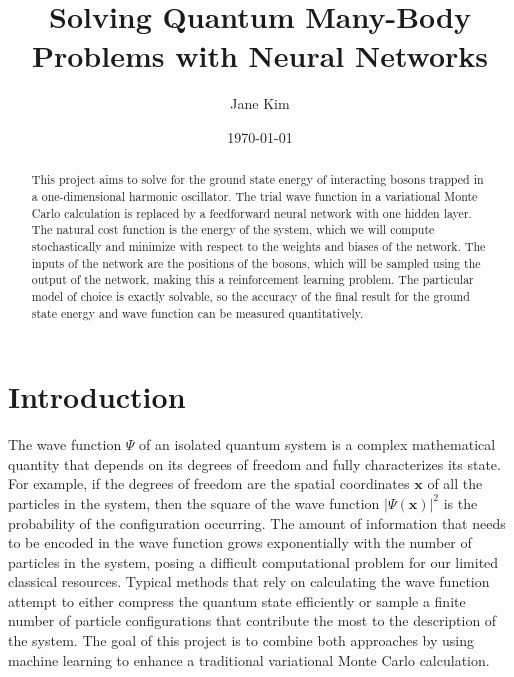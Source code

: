 \documentclass[prb,aps,twocolumn,showpacs,10pt]{revtex4-1}
\begin{document}
\title {Solving Quantum Many-Body Problems with Neural Networks}
\author{Jane Kim}
\date{\today}
\begin{abstract}
\vspace*{3mm}
This project aims to solve for the ground state energy of interacting bosons trapped in a one-dimensional harmonic oscillator. The trial wave function in a variational Monte Carlo calculation is replaced by a feedforward neural network with one hidden layer. The natural cost function is the energy of the system, which we will compute stochastically and minimize with respect to the weights and biases of the network. The inputs of the network are the positions of the bosons, which will be sampled using the output of the network, making this a reinforcement learning problem. The particular model of choice is exactly solvable, so the accuracy of the final result for the ground state energy and wave function can be measured quantitatively.
\end{abstract}

\maketitle


\section{Introduction}

The wave function $\Psi$ of an isolated quantum system is a complex mathematical quantity that depends on its degrees of freedom and fully characterizes its state. For example, if the degrees of freedom are the spatial coordinates $\bm{x}$ of all the particles in the system, then the square of the wave function $| \Psi(\bm{x}) |^2$ is the probability of the configuration occurring. The amount of information that needs to be encoded in the wave function grows exponentially with the number of particles in the system, posing a difficult computational problem for our limited classical resources. Typical methods that rely on calculating the wave function attempt to either compress the quantum state efficiently or sample a finite number of particle configurations that contribute the most to the description of the system. The goal of this project is to combine both approaches by using machine learning to enhance a traditional variational Monte Carlo calculation. 
\end{document}
